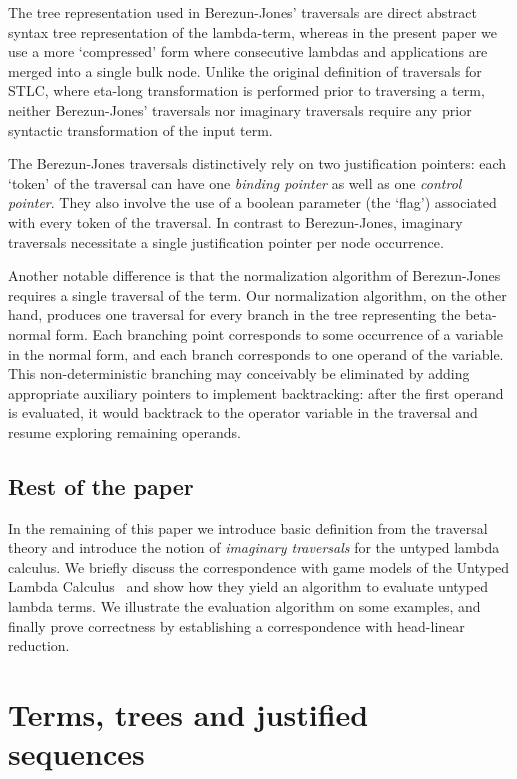 \documentclass{elsarticle}
\theoremstyle{plain}
\theoremstyle{definition}
\theoremstyle{remark}
\begin{document}
The tree representation used in Berezun-Jones' traversals are direct abstract syntax tree representation of the lambda-term, whereas in the present paper we use a more `compressed' form where consecutive lambdas and applications are merged into a single bulk node. Unlike the original definition of traversals for STLC, where eta-long transformation is performed prior to traversing a term, neither Berezun-Jones' traversals nor imaginary traversals require any prior syntactic transformation of the input term.

The Berezun-Jones traversals distinctively rely on two justification pointers: each `token' of the traversal can have one \emph{binding pointer} as well as one \emph{control pointer}. They also involve the use of a boolean parameter (the `flag') associated with every token of the traversal. In contrast to Berezun-Jones,  imaginary traversals necessitate a single justification pointer per node occurrence.

Another notable difference is that the normalization algorithm of Berezun-Jones requires a single traversal of the term. Our normalization algorithm, on the other hand, produces one traversal for every branch in the tree representing the beta-normal form. Each branching point corresponds to some occurrence of a variable in the normal form, and each branch corresponds to one operand of the variable. This non-deterministic branching may conceivably be eliminated by adding appropriate auxiliary pointers to implement backtracking: after the first operand is evaluated, it would backtrack to the operator variable in the traversal and resume exploring remaining operands.

\subsection{Rest of the paper}

In the remaining of this paper we introduce basic definition from the traversal theory and introduce the notion of \emph{imaginary traversals} for the untyped lambda calculus. We briefly discuss the correspondence with game models of the Untyped Lambda Calculus~\cite{KerThesis} and show how they yield an algorithm to evaluate untyped lambda terms. We illustrate the evaluation algorithm on some examples, and finally prove correctness by establishing a correspondence with head-linear reduction.

\section{Terms, trees and justified sequences}
\end{document}
